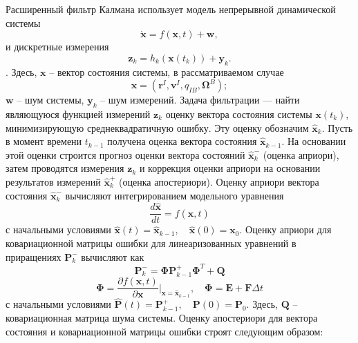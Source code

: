 Расширенный фильтр Калмана использует модель непрерывной динамической системы
\begin{equation} \label{eq:ekf_system}
\dot{\bm{x}} = f(\bm x, t) + \bm w,
\end{equation}
и дискретные измерения
\begin{equation} \label{eq:ekf_mes}
\bm z_k = h_k(\bm x(t_k)) + \bm y_k.
\end{equation}.
Здесь, $\bm x$ -- вектор состояния системы, в рассматриваемом случае
\begin{equation} \label{eq:ekf_state}
\bm x = (\bm r^I, \bm v^I, q_{IB},\bm \Omega^B);
\end{equation}
$\bm w$ -- шум системы, $\bm y_k$ -- шум измерений.
Задача фильтрации — найти являющуюся функцией измерений
$\bm z_k$
оценку вектора состояния системы
$\bm x(t_k)$,
минимизирующую среднеквадратичную ошибку.
Эту оценку обозначим $\hat{\bm{x}}_k$.
Пусть в момент времени $t_{k-1}$ получена оценка вектора состояния
$\hat{\bm{x}}_{k-1}$.
На основании этой оценки строится прогноз оценки вектора состояний
$\hat{\bm{x}}_k^-$
(оценка априори), затем проводятся измерения
$\bm z_k$
и коррекция оценки априори на основании результатов измерений
$\hat{\bm{x}}_k^+$
(оценка апостериори). Оценку априори вектора состояния
$\hat{\bm{x}}_k^-$ вычисляют интегрированием модельного уравнения
\begin{equation}
\frac{d\hat{\bm{x}}}{dt} = f(\hat{\bm{x}}, t)
\end{equation}
с начальными условиями
$\hat{\bm{x}}(t) = \hat{\bm{x}}_{k-1}, \quad \hat{\bm{x}}(0) = \bm x_0$.
Оценку априори для ковариационной матрицы ошибки для линеаризованных уравнений в приращениях
$\bm P_k^-$
вычисляют как
\begin{equation}
\bm P_k^- = \bm \Phi \bm P_{k-1}^+ \bm \Phi^{T} + \bm Q
\end{equation}
\begin{equation}
\bm \Phi = \frac{\partial f(\bm x, t)}{\partial \bm x} \Bigg|_{\bm{x} = \hat{\bm{x}}_{k-1}}
, \quad
\bm \Phi = \bm E + \bm F \Delta t
\end{equation}
с начальными условиями
$\hat{\bm{P}}(t) = \bm{P}_{k-1}^+, \quad \bm{P}(0) = \bm P_0$.
Здесь, $\bm Q$ -- ковариационная матрица шума системы. Оценку апостериори для вектора состояния и ковариационной матрицы ошибки строят следующим образом:
